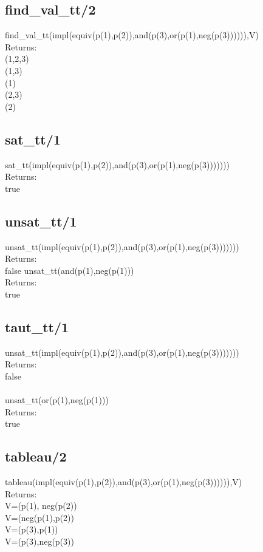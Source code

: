 \documentclass[a4paper,10pt]{article}
\begin{document}
\subsection*{find\_val\_tt/2}
\textsf{find\_val\_tt(impl(equiv(p(1),p(2)),and(p(3),or(p(1),neg(p(3)))))),V)}\\
Returns:\\
\textsf{(1,2,3)\\
		(1,3)\\
		(1)\\
		(2,3)\\
		(2)}
\subsection*{sat\_tt/1}
\textsf{sat\_tt(impl(equiv(p(1),p(2)),and(p(3),or(p(1),neg(p(3)))))))}\\
Returns:\\
\textsf{true}
\subsection*{unsat\_tt/1}
\textsf{unsat\_tt(impl(equiv(p(1),p(2)),and(p(3),or(p(1),neg(p(3)))))))}\\
Returns:\\
\textsf{false}
\textsf{unsat\_tt(and(p(1),neg(p(1)))}\\
Returns:\\
\textsf{true}
\subsection*{taut\_tt/1}
\textsf{unsat\_tt(impl(equiv(p(1),p(2)),and(p(3),or(p(1),neg(p(3)))))))}\\
Returns:\\
\textsf{false}
\\\\
\textsf{unsat\_tt(or(p(1),neg(p(1)))}\\
Returns:\\
\textsf{true}
\subsection*{tableau/2}
\textsf{tableau(impl(equiv(p(1),p(2)),and(p(3),or(p(1),neg(p(3)))))),V)}\\
Returns:\\
\textsf{V=(p(1), neg(p(2))\\
		V=(neg(p(1),p(2))\\
		V=(p(3),p(1))\\
		V=(p(3),neg(p(3))}
\end{document}
